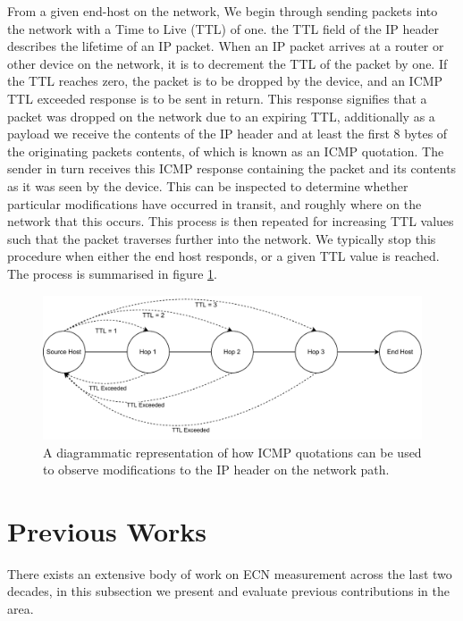 \documentclass{l4proj}
\begin{document}
From a given end-host on the network, We begin through sending packets into the network with a Time to Live (TTL) of one. the TTL field of the IP header describes the lifetime of an IP packet. When an IP packet arrives at a router or other device on the network, it is to decrement the TTL of the packet by one. If the TTL reaches zero, the packet is to be dropped by the device, and an ICMP TTL exceeded response is to be sent in return. This response signifies that a packet was dropped on the network due to an expiring TTL, additionally as a payload we receive the contents of the IP header and at least the first 8 bytes of the originating packets contents, of which is known as an ICMP quotation. The sender in turn receives this ICMP response containing the packet and its contents as it was seen by the device. This can be inspected to determine whether particular modifications have occurred in transit, and roughly where on the network that this occurs. This process is then repeated for increasing TTL values such that the packet traverses further into the network. We typically stop this procedure when either the end host responds, or a given TTL value is reached. The process is summarised in figure \ref{fig:icmp}.

\begin{figure}[H]

\centering
\includegraphics[width=14cm,keepaspectratio]{dissertation/images/icmp.pdf}
\caption{A diagrammatic representation of how ICMP quotations can be used to observe modifications to the IP header on the network path.}
\label{fig:icmp}
\end{figure}

\section{Previous Works}

There exists an extensive body of work on ECN measurement across the last two decades, in this subsection we present and evaluate previous contributions in the area.
\end{document}
